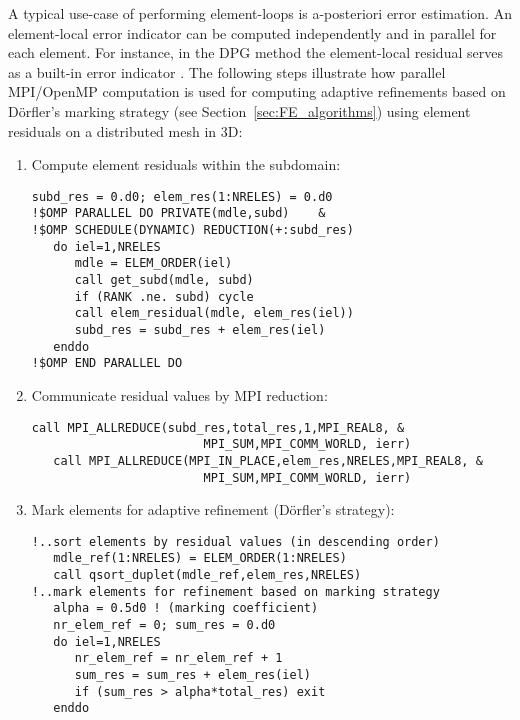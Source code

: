 A typical use-case of performing element-loops is a-posteriori error estimation. An element-local error indicator can be computed independently and in parallel for each element. For instance, in the DPG method the element-local residual serves as a built-in error indicator \cite{demkowicz2017dpg}. The following steps illustrate how parallel MPI/OpenMP computation is used for computing adaptive refinements based on D\"orfler's marking strategy
(see Section~\ref{sec:FE_algorithms}) using element residuals on a distributed mesh in \hp3D:
\begin{enumerate}
\item
	Compute element residuals within the subdomain:
	\begin{lstlisting}[caption=Adaptive refinements based on element residuals: (a) subdomain computation., label={lst:adaptive_refinement_element_loop1}]
   subd_res = 0.d0; elem_res(1:NRELES) = 0.d0
!$OMP PARALLEL DO PRIVATE(mdle,subd)    &
!$OMP SCHEDULE(DYNAMIC) REDUCTION(+:subd_res)
   do iel=1,NRELES
      mdle = ELEM_ORDER(iel)
      call get_subd(mdle, subd)
      if (RANK .ne. subd) cycle
      call elem_residual(mdle, elem_res(iel))
      subd_res = subd_res + elem_res(iel)
   enddo
!$OMP END PARALLEL DO
\end{lstlisting}
\item
	Communicate residual values by MPI reduction:
	\begin{lstlisting}[caption=Adaptive refinements based on element residuals: (b) global communication., label={lst:adaptive_refinement_element_loop2}]
   call MPI_ALLREDUCE(subd_res,total_res,1,MPI_REAL8, &
                        MPI_SUM,MPI_COMM_WORLD, ierr)
   call MPI_ALLREDUCE(MPI_IN_PLACE,elem_res,NRELES,MPI_REAL8, &
                        MPI_SUM,MPI_COMM_WORLD, ierr)
\end{lstlisting}
\item
	Mark elements for adaptive refinement (D\"orfler's strategy):
	\begin{lstlisting}[caption=Adaptive refinements based on element residuals: (c) element marking., label={lst:adaptive_refinement_element_loop3}]
!..sort elements by residual values (in descending order)
   mdle_ref(1:NRELES) = ELEM_ORDER(1:NRELES)
   call qsort_duplet(mdle_ref,elem_res,NRELES)
!..mark elements for refinement based on marking strategy
   alpha = 0.5d0 ! (marking coefficient)
   nr_elem_ref = 0; sum_res = 0.d0
   do iel=1,NRELES
      nr_elem_ref = nr_elem_ref + 1
      sum_res = sum_res + elem_res(iel)
      if (sum_res > alpha*total_res) exit
   enddo

\end{lstlisting}
\end{enumerate}
